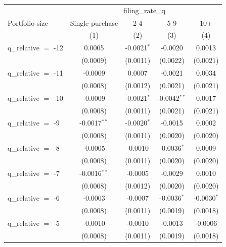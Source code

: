 
\begingroup
\centering
\begin{tabular}{lcccc}
   \toprule
    & \multicolumn{4}{c}{filing\_rate\_q}\\
   Portfolio size       & Single-purchase        & 2-4            & 5-9             & 10+ \\   
                        & (1)                    & (2)            & (3)             & (4)\\  
   \midrule 
   q\_relative $=$ -12  & 0.0005                 & -0.0021$^{*}$  & -0.0020         & 0.0013\\   
                        & (0.0009)               & (0.0011)       & (0.0022)        & (0.0021)\\   
   q\_relative $=$ -11  & -0.0009                & 0.0007         & -0.0021         & 0.0034\\   
                        & (0.0008)               & (0.0012)       & (0.0021)        & (0.0021)\\   
   q\_relative $=$ -10  & -0.0009                & -0.0021$^{*}$  & -0.0042$^{**}$  & 0.0017\\   
                        & (0.0008)               & (0.0011)       & (0.0021)        & (0.0021)\\   
   q\_relative $=$ -9   & -0.0017$^{**}$         & -0.0020$^{*}$  & -0.0015         & 0.0002\\   
                        & (0.0008)               & (0.0011)       & (0.0020)        & (0.0020)\\   
   q\_relative $=$ -8   & -0.0005                & -0.0010        & -0.0036$^{*}$   & 0.0009\\   
                        & (0.0008)               & (0.0011)       & (0.0020)        & (0.0020)\\   
   q\_relative $=$ -7   & -0.0016$^{**}$         & -0.0005        & -0.0029         & 0.0010\\   
                        & (0.0008)               & (0.0012)       & (0.0020)        & (0.0020)\\   
   q\_relative $=$ -6   & -0.0003                & -0.0007        & -0.0036$^{*}$   & -0.0030$^{*}$\\   
                        & (0.0008)               & (0.0011)       & (0.0019)        & (0.0018)\\   
   q\_relative $=$ -5   & -0.0010                & -0.0010        & -0.0013         & -0.0006\\   
                        & (0.0008)               & (0.0011)       & (0.0019)        & (0.0018)\\   

\end{tabular}
